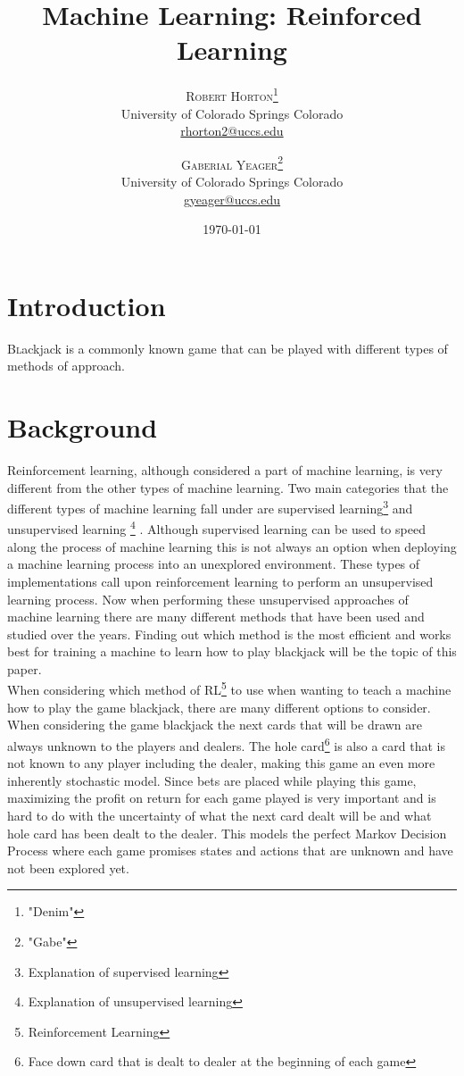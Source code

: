 \documentclass[twoside,twocolumn]{article}
\title{Machine Learning: Reinforced Learning} %
\author{%
\textsc{Robert Horton}\thanks{"Denim"} \\[1ex] %
\normalsize University of Colorado Springs Colorado \\ %
\normalsize \href{mailto:rhorton2@uccs.edu}{rhorton2@uccs.edu} %
\and %
\textsc{Gaberial Yeager}\thanks{"Gabe"} \\[1ex] %
\normalsize University of Colorado Springs Colorado \\ %
\normalsize \href{mailto:gyeager@uccs.edu}{gyeager@uccs.edu} %
}
\date{\today} %
\begin{document}
\maketitle


\section{Introduction}

\lettrine[nindent=0em,lines=3]{B}lackjack is a commonly known game that can be played with different types of methods of approach.


\section{Background}

Reinforcement learning, although considered a part of machine learning, is very different from the other types of machine learning.  Two main categories that the different types of machine learning fall under are supervised learning\footnote{Explanation of supervised learning} and unsupervised learning \footnote{Explanation of unsupervised learning} \cite{sutton:2018}.  Although supervised learning can be used to speed along the process of machine learning this is not always an option when deploying a machine learning process into an unexplored environment.  These types of implementations call upon reinforcement learning to perform an unsupervised learning process.  Now when performing these unsupervised approaches of machine learning there are many different methods that have been used and studied over the years.  Finding out which method is the most efficient and works best for training a machine to learn how to play blackjack will be the topic of this paper.\\ 

\indent When considering which method of RL\footnote{Reinforcement Learning} to use when wanting to teach a machine how to play the game blackjack, there are many different options to consider.  When considering the game blackjack the next cards that will be drawn are always unknown to the players and dealers.  The hole card\footnote{Face down card that is dealt to dealer at the beginning of each game} is also a card that is not known to any player including the dealer, making this game an even more inherently stochastic model.  Since bets are placed while playing this game, maximizing the profit on return for each game played is very important and is hard to do with the uncertainty of what the next card dealt will be and what hole card has been dealt to the dealer.  This models the perfect Markov Decision Process where each game promises states and actions that are unknown and have not been explored yet.\\
\end{document}

